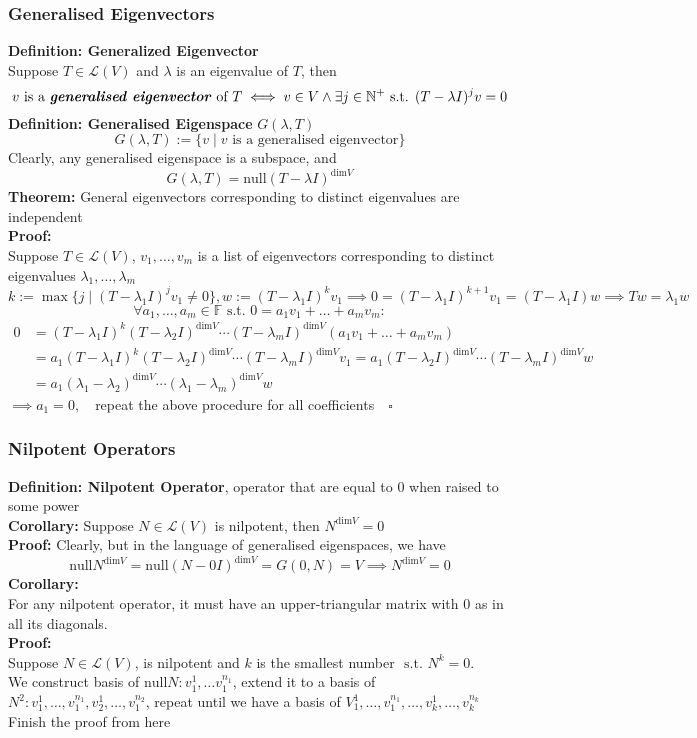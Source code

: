 \documentclass{article}
\newcommand{\N}{\mathbb{N}}
\newcommand{\F}{\mathbb{F}}
\newcommand{\st}{\mbox{ s.t. }}
\newcommand{\0}{{\bf{0}}}
\begin{document}
\subsubsection{Generalised Eigenvectors}
\textbf{Definition: Generalized Eigenvector}\\
Suppose $T\in\mathcal{L}(V)$ and $\lambda$ is an eigenvalue of $T$, then
$$v\mbox{ is a \textit{\textbf{generalised eigenvector}} of }T\iff v\in V\land\exists j\in\N^+\st (T-\lambda I)^jv=0$$
\textbf{Definition: Generalised Eigenspace} $G(\lambda,T)$
$$G(\lambda,T):=\{v\mid v\mbox{ is a generalised eigenvector}\}$$
Clearly, any generalised eigenspace is a subspace, and
$$G(\lambda,T)=\mbox{null}(T-\lambda I)^{\mbox{dim}V}$$
\textbf{Theorem:} General eigenvectors corresponding to distinct eigenvalues are independent\\
\textbf{Proof:}\\
Suppose $T\in\mathcal{L}(V)$, $v_1,\dots,v_m$ is a list of eigenvectors corresponding to distinct eigenvalues $\lambda_1,\dots,\lambda_m$
$$k:=\max\{j\mid(T-\lambda_1 I)^jv_1\neq0\},w:=(T-\lambda_1 I)^kv_1\implies0=(T-\lambda_1 I)^{k+1}v_1=(T-\lambda_1 I)w\implies Tw=\lambda_1w$$
$$\forall a_1,\dots,a_m\in\F\st0=a_1v_1+\dots+a_mv_m:$$
\begin{equation}
\begin{split}
    0&=(T-\lambda_1 I)^k(T-\lambda_2 I)^{\mbox{dim}V}\cdots(T-\lambda_m I)^{\mbox{dim}V}(a_1v_1+\dots+a_mv_m)\\    
    &=a_1(T-\lambda_1 I)^k(T-\lambda_2 I)^{\mbox{dim}V}\cdots(T-\lambda_m I)^{\mbox{dim}V}v_1=a_1(T-\lambda_2 I)^{\mbox{dim}V}\cdots(T-\lambda_m I)^{\mbox{dim}V}w\\
    &=a_1(\lambda_1-\lambda_2)^{\mbox{dim}V}\cdots(\lambda_1-\lambda_m)^{\mbox{dim}V}w
\end{split}
\end{equation}
$\implies a_1=0,\quad$repeat the above procedure for all coefficients$\quad\square$
\subsubsection{Nilpotent Operators}
\textbf{Definition: Nilpotent Operator}, operator that are equal to 0 when raised to some power\\
\textbf{Corollary:} Suppose $N\in\mathcal{L}(V)$ is nilpotent, then $N^{\mbox{dim}V}=0$\\
\textbf{Proof:} Clearly, but in the language of generalised eigenspaces, we have
$$\mbox{null}N^{\mbox{dim}V}=\mbox{null}(N-0I)^{\mbox{dim}V}=G(0,N)=V\implies N^{\mbox{dim}V}=0$$
\textbf{Corollary:}\\
For any nilpotent operator, it must have an upper-triangular matrix with 0 as in all its diagonals.\\
\textbf{Proof:}\\
Suppose $N\in\mathcal{L}(V)$, is nilpotent and $k$ is the smallest number $\st N^k=0$.\\
We construct basis of $\mbox{null}N:v_1^1,\dots v_1^{n_1}$, extend it to a basis of $N^2:v_1^1,\dots,v_1^{n_1},v_2^1,\dots,v_1^{n_2}$, repeat until we have a basis of $V_1^1,\dots,v_1^{n_1},\dots,v_k^1,\dots,v_k^{n_k}$\\
\null\hfill{Finish the proof from here}
\end{document}
